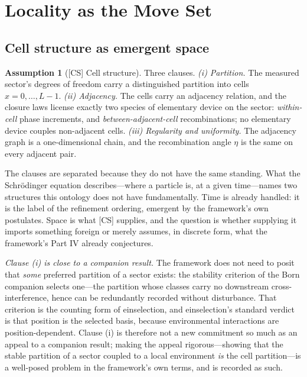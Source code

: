 \documentclass[11pt]{article}
\theoremstyle{definition}
\newtheorem{assumption}{Assumption}
\theoremstyle{remark}
\begin{document}
\section{Locality as the Move Set}\label{sec:moveset}

\subsection{Cell structure as emergent space}
\begin{assumption}[{[CS]} Cell structure]\label{ass:cs}
Three clauses. \emph{(i) Partition.} The measured sector's degrees of freedom carry a distinguished partition into cells $x = 0, \dots, L-1$. \emph{(ii) Adjacency.} The cells carry an adjacency relation, and the closure laws license exactly two species of elementary device on the sector: \emph{within-cell} phase increments, and \emph{between-adjacent-cell} recombinations; no elementary device couples non-adjacent cells. \emph{(iii) Regularity and uniformity.} The adjacency graph is a one-dimensional chain, and the recombination angle $\eta$ is the same on every adjacent pair.
\end{assumption}

The clauses are separated because they do not have the same standing. What the Schr\"odinger equation describes---where a particle is, at a given time---names two structures this ontology does not have fundamentally. Time is already handled: it is the label of the refinement ordering, emergent by the framework's own postulates. Space is what [CS] supplies, and the question is whether supplying it imports something foreign or merely assumes, in discrete form, what the framework's Part IV already conjectures.

\emph{Clause (i) is close to a companion result.} The framework does not need to posit that \emph{some} preferred partition of a sector exists: the stability criterion of the Born companion \cite{TillittBorn} selects one---the partition whose classes carry no downstream cross-interference, hence can be redundantly recorded without disturbance. That criterion is the counting form of einselection, and einselection's standard verdict is that position is the selected basis, because environmental interactions are position-dependent. Clause (i) is therefore not a new commitment so much as an appeal to a companion result; making the appeal rigorous---showing that the stable partition of a sector coupled to a local environment \emph{is} the cell partition---is a well-posed problem in the framework's own terms, and is recorded as such.
\end{document}
